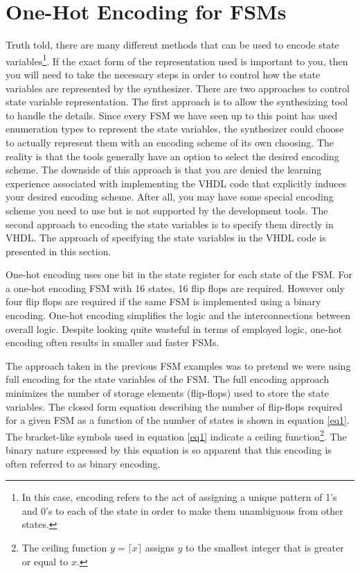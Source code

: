 \section{One-Hot Encoding for FSMs}
Truth told, there are many different methods that can be used to encode state variables\footnote{In this case, encoding refers to the act of assigning a unique pattern of  1's and 0's to each of the state in order to make them unambiguous from other states.}. If the exact form of the representation used is important to you, then you will need to take the necessary steps in order to control how the state variables are represented by the synthesizer. There are two approaches to control state variable representation. The first approach is to allow the synthesizing tool to handle the details. Since every FSM we have seen up to this point has used enumeration types to represent the state variables, the synthesizer could choose to actually represent them with an encoding scheme of its own choosing. The reality is that the tools generally have an option to select the desired encoding scheme. The downside of this approach is that you are denied the learning experience associated with implementing the VHDL code that explicitly induces your desired encoding scheme. After all, you may have some special encoding scheme you need to use but is not supported by the development tools. The second approach to encoding the state variables is to specify them directly in VHDL. The approach of specifying the state variables in the VHDL code is presented in this section. 

One-hot encoding uses one bit in the state register for each state of the FSM. For a one-hot encoding FSM with 16 states, 16 flip flops are required. However only four flip flops are required if the same FSM is implemented using a binary encoding. One-hot encoding simplifies the logic and the interconnections between overall logic. Despite looking quite wasteful in terms of employed logic, one-hot encoding often results in smaller and faster FSMs.

The approach taken in the previous FSM examples was to pretend we were using full encoding for the state variables of the FSM. The full encoding approach minimizes the number of storage elements (flip-flops) used to store the state variables. The closed form equation describing the number of flip-flops required for a given FSM as a function of the number of states is shown in equation \ref{eq1}. The bracket-like symbols used in equation \ref{eq1} indicate a ceiling function\footnote{The ceiling function $y=\lceil x \rceil$ assigns $y$ to the smallest integer that is greater or equal to $x$.}. The binary nature expressed by this equation is so apparent that this encoding is often referred to as binary encoding.


